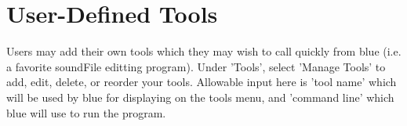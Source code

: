 \section{User-Defined Tools}\label{userDefinedTools}

Users may add their own tools which they may wish to call quickly from
blue (i.e. a favorite soundFile editting program). Under 'Tools', select
'Manage Tools' to add, edit, delete, or reorder your tools. Allowable
input here is 'tool name' which will be used by blue for displaying on
the tools menu, and 'command line' which blue will use to run the
program.
